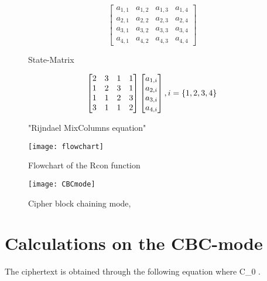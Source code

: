 \begin{figure}
  \begin{equation}
    \begin{bmatrix}
      a_{1, 1} & a_{1, 2} & a_{1,3} & a_{1,4} \\
      a_{2, 1} & a_{2, 2} & a_{2,3} & a_{2,4} \\
      a_{3, 1} & a_{3, 2} & a_{3,3} & a_{3,4} \\
      a_{4, 1} & a_{4, 2} & a_{4,3} & a_{4,4}
    \end{bmatrix}
  \end{equation}
  \caption{State-Matrix}
  \label{matrix:state}
\end{figure}

\begin{figure}
  \begin{equation}
    \begin{bmatrix}
      2 & 3 & 1 & 1 \\
      1 & 2 & 3 & 1 \\
      1 & 1 & 2 & 3 \\
      3 & 1 & 1 & 2
    \end{bmatrix}
    \*
    \begin{bmatrix}
      a_{1,i} \\ 
      a_{2,i} \\
      a_{3,i} \\
      a_{4,i}
    \end{bmatrix}
    ,i = \{1,2,3,4\}
  \end{equation}
  \caption{"Rijndael MixColumns equation"}
  \label{matrix:rijMix}
\end{figure}


\begin{figure}
  \begin{center}
    \texttt{[image: flowchart]}
  \end{center}
  \caption{Flowchart of the Rcon function}
  \label{app:flowchart}
\end{figure}

\begin{figure}
  \begin{center}
   \texttt{[image: CBCmode]}
  \end{center}
  \caption{Cipher block chaining mode, \citep{CBCmode:2014}}
  \label{img:CBCmode}
\end{figure}

\section{Calculations on the CBC-mode} \label{sec:CBCcalc}
The ciphertext is obtained through the following equation where \newline
C_{0} \oplus.

